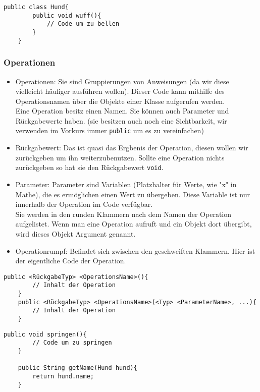 \begin{lstlisting}[title=\textbf{Klassen Beispiel}]
	public class Hund{
		public void wuff(){
			// Code um zu bellen
		}
	}
\end{lstlisting}
\begin{Infobox}
	\subsubsection*{Operationen}
	\begin{itemize}
		\item Operationen: Sie sind Gruppierungen von Anweisungen (da wir diese vielleicht häufiger ausführen wollen).
			Dieser Code kann mithilfe des Operationsnamen über die Objekte einer Klasse aufgerufen werden.\\
			Eine Operation besitz einen Namen. Sie können auch Parameter und Rückgabewerte haben. (sie besitzen auch noch eine Sichtbarkeit, wir verwenden im Vorkurs immer \lstinline{public} um es zu vereinfachen)
		\item Rückgabewert: Das ist quasi das Ergbenis der Operation, diesen wollen wir zurückgeben um ihn weiterzubenutzen.
			Sollte eine Operation nichts zurückgeben so hat sie den Rückgabewert \lstinline{void}.
		\item Parameter: Parameter sind Variablen (Platzhalter für Werte, wie "x" in Mathe), die es ermöglichen einen Wert zu übergeben. Diese Variable ist nur innerhalb der Operation im Code verfügbar.\\
			Sie werden in den runden Klammern nach dem Namen der Operation aufgelistet.
			Wenn man eine Operation aufruft und ein Objekt dort übergibt, wird dieses Objekt Argument genannt.
		\item Operationrumpf: Befindet sich zwischen den geschweiften Klammern. Hier ist der eigentliche Code der Operation.
	\end{itemize}

\end{Infobox}

\begin{lstlisting}[title=\textbf{Operations Syntax}]
	public <RückgabeTyp> <OperationsName>(){
		// Inhalt der Operation
	}
	public <RückgabeTyp> <OperationsName>(<Typ> <ParameterName>, ...){
		// Inhalt der Operation
	}
\end{lstlisting}

\newpage

\begin{lstlisting}[title=\textbf{Operations Beispiel}]
	public void springen(){
		// Code um zu springen
	}
	
	public String getName(Hund hund){
		return hund.name;
	}
\end{lstlisting}

